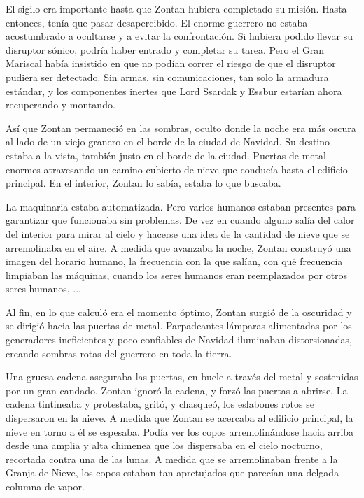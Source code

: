 El sigilo era importante hasta que Zontan hubiera completado su misión. Hasta entonces, tenía que pasar desapercibido. El enorme guerrero no estaba acostumbrado a ocultarse y a evitar la confrontación. Si hubiera podido llevar su disruptor sónico, podría haber entrado y completar su tarea. Pero el Gran Mariscal había insistido en que no podían correr el riesgo de que el disruptor pudiera ser detectado. Sin armas, sin comunicaciones, tan solo la armadura estándar, y los componentes inertes que Lord Ssardak y Essbur estarían ahora recuperando y montando.



Así que Zontan permaneció en las sombras, oculto donde la noche era más oscura al lado de un viejo granero en el borde de la ciudad de Navidad. Su destino estaba a la vista, también justo en el borde de la ciudad. Puertas de metal enormes atravesando un camino cubierto de nieve que conducía hasta el edificio principal. En el interior, Zontan lo sabía, estaba lo que buscaba.



La maquinaria estaba automatizada. Pero varios humanos estaban presentes para garantizar que funcionaba sin problemas. De vez en cuando alguno salía del calor del interior para mirar al cielo y hacerse una idea de la cantidad de nieve que se arremolinaba en el aire. A medida que avanzaba la noche, Zontan construyó una imagen del horario humano, la frecuencia con la que salían, con qué frecuencia limpiaban las máquinas, cuando los seres humanos eran reemplazados por otros seres humanos, ...



Al fin, en lo que calculó era el momento óptimo, Zontan surgió de la oscuridad y se dirigió hacia las puertas de metal. Parpadeantes lámparas alimentadas por los generadores ineficientes y poco confiables de Navidad iluminaban distorsionadas, creando sombras rotas del guerrero en toda la tierra.



Una gruesa cadena aseguraba las puertas, en bucle a través del metal y sostenidas por un gran candado. Zontan ignoró la cadena, y forzó las puertas a abrirse. La cadena tintineaba y protestaba, gritó, y chasqueó, los eslabones rotos se dispersaron en la nieve. A medida que Zontan se acercaba al edificio principal, la nieve en torno a él se espesaba. Podía ver los copos arremolinándose hacia arriba desde una amplia y alta chimenea que los dispersaba en el cielo nocturno, recortada contra una de las lunas. A medida que se arremolinaban frente a la Granja de Nieve, los copos estaban tan apretujados que parecían una delgada columna de vapor.




